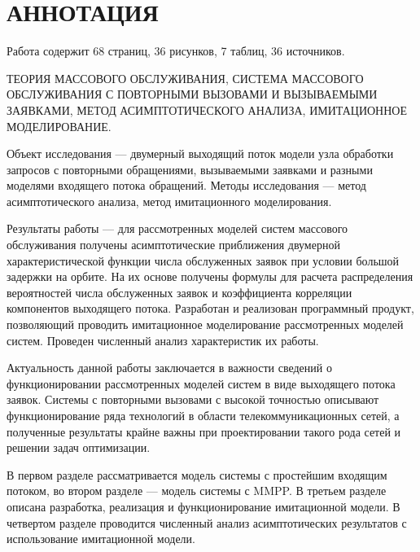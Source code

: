 \section*{\normalsize\centering АННОТАЦИЯ}
Работа содержит 68 страниц, 36 рисунков, 7 таблиц, 36 источников.
 
ТЕОРИЯ МАССОВОГО ОБСЛУЖИВАНИЯ, СИСТЕМА МАССОВОГО ОБСЛУЖИВАНИЯ С ПОВТОРНЫМИ ВЫЗОВАМИ И ВЫЗЫВАЕМЫМИ ЗАЯВКАМИ, МЕТОД АСИМПТОТИЧЕСКОГО АНАЛИЗА, ИМИТАЦИОННОЕ МОДЕЛИРОВАНИЕ.

Объект исследования --- двумерный выходящий поток модели узла обработки запросов с повторными обращениями, вызываемыми заявками и разными моделями входящего потока обращений.
Методы исследования --- метод асимптотического анализа, метод имитационного моделирования. 

Результаты работы --- для рассмотренных моделей систем массового обслуживания получены асимптотические приближения двумерной характеристической функции числа обслуженных заявок при условии большой задержки на орбите. На их основе получены формулы для расчета распределения вероятностей числа обслуженных заявок и коэффициента корреляции компонентов выходящего потока. Разработан и реализован программный продукт, позволяющий проводить имитационное моделирование рассмотренных моделей систем. Проведен численный анализ характеристик их работы.

Актуальность данной работы заключается в важности сведений о функционировании рассмотренных моделей систем в виде выходящего потока заявок. Системы с повторными вызовами с высокой точностью описывают функционирование ряда технологий в области телекоммуникационных сетей, а полученные результаты крайне важны при проектировании такого рода сетей и решении задач оптимизации.

В первом разделе рассматривается модель системы с простейшим входящим потоком, во втором разделе --- модель системы с MMPP. В третьем разделе описана разработка, реализация и функционирование имитационной модели. В четвертом разделе проводится численный анализ асимптотических результатов с использование имитационной модели.

\thispagestyle{empty} %
\clearpage